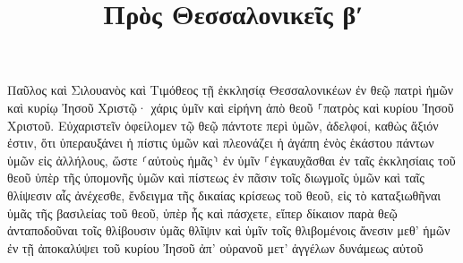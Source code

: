 \documentclass{openreader}
\title{Πρὸς Θεσσαλονικεῖς βʹ}
\date{}
\begin{document}
\maketitle
\raggedbottom 
\fontsize{16pt}{24pt}\selectfont


Παῦλος καὶ Σιλουανὸς καὶ Τιμόθεος τῇ ἐκκλησίᾳ Θεσσαλονικέων ἐν θεῷ πατρὶ ἡμῶν καὶ κυρίῳ Ἰησοῦ Χριστῷ· 
χάρις ὑμῖν καὶ εἰρήνη ἀπὸ θεοῦ ⸀πατρὸς καὶ κυρίου Ἰησοῦ Χριστοῦ. 
Εὐχαριστεῖν ὀφείλομεν τῷ θεῷ πάντοτε περὶ ὑμῶν, ἀδελφοί, καθὼς ἄξιόν ἐστιν, ὅτι ὑπεραυξάνει ἡ πίστις ὑμῶν καὶ πλεονάζει ἡ ἀγάπη ἑνὸς ἑκάστου πάντων ὑμῶν εἰς ἀλλήλους, 
ὥστε ⸂αὐτοὺς ἡμᾶς⸃ ἐν ὑμῖν ⸀ἐγκαυχᾶσθαι ἐν ταῖς ἐκκλησίαις τοῦ θεοῦ ὑπὲρ τῆς ὑπομονῆς ὑμῶν καὶ πίστεως ἐν πᾶσιν τοῖς διωγμοῖς ὑμῶν καὶ ταῖς θλίψεσιν αἷς ἀνέχεσθε, 
ἔνδειγμα τῆς δικαίας κρίσεως τοῦ θεοῦ, εἰς τὸ καταξιωθῆναι ὑμᾶς τῆς βασιλείας τοῦ θεοῦ, ὑπὲρ ἧς καὶ πάσχετε, 
εἴπερ δίκαιον παρὰ θεῷ ἀνταποδοῦναι τοῖς θλίβουσιν ὑμᾶς θλῖψιν 
καὶ ὑμῖν τοῖς θλιβομένοις ἄνεσιν μεθ’ ἡμῶν ἐν τῇ ἀποκαλύψει τοῦ κυρίου Ἰησοῦ ἀπ’ οὐρανοῦ μετ’ ἀγγέλων δυνάμεως αὐτοῦ 
\end{document}
